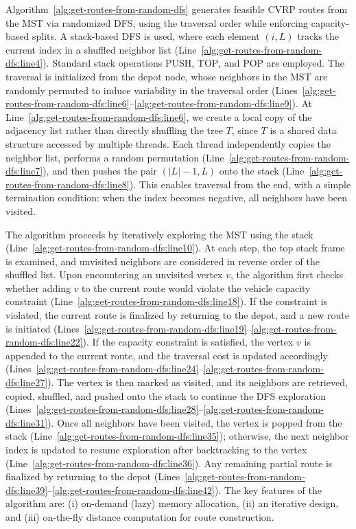Algorithm~\ref{alg:get-routes-from-random-dfs} generates feasible CVRP routes from the MST via randomized DFS, using the traversal order while enforcing capacity-based splits. A stack-based DFS is used, where each element $(i, L)$ tracks the current index in a shuffled neighbor list (Line~\ref{alg:get-routes-from-random-dfs:line4}). Standard stack operations \textsc{PUSH}, \textsc{TOP}, and \textsc{POP} are employed. The traversal is initialized from the depot node, whose neighbors in the MST are randomly permuted to induce variability in the traversal order (Lines~\ref{alg:get-routes-from-random-dfs:line6}--\ref{alg:get-routes-from-random-dfs:line9}). At Line~\ref{alg:get-routes-from-random-dfs:line6}, we create a local copy of the adjacency list rather than directly shuffling the tree $T$, since $T$ is a shared data structure accessed by multiple threads. Each thread independently copies the neighbor list, performs a random permutation (Line~\ref{alg:get-routes-from-random-dfs:line7}), and then pushes the pair $(|L|-1, L)$ onto the stack (Line~\ref{alg:get-routes-from-random-dfs:line8}). This enables traversal from the end, with a simple termination condition: when the index becomes negative, all neighbors have been visited.

The algorithm proceeds by iteratively exploring the MST using the stack (Line~\ref{alg:get-routes-from-random-dfs:line10}). At each step, the top stack frame is examined, and unvisited neighbors are considered in reverse order of the shuffled list. Upon encountering an unvisited vertex $v$, the algorithm first checks whether adding $v$ to the current route would violate the vehicle capacity constraint (Line~\ref{alg:get-routes-from-random-dfs:line18}). If the constraint is violated, the current route is finalized by returning to the depot, and a new route is initiated (Lines~\ref{alg:get-routes-from-random-dfs:line19}--\ref{alg:get-routes-from-random-dfs:line22}). If the capacity constraint is satisfied, the vertex $v$ is appended to the current route, and the traversal cost is updated accordingly (Lines~\ref{alg:get-routes-from-random-dfs:line24}--\ref{alg:get-routes-from-random-dfs:line27}). The vertex is then marked as visited, and its neighbors are retrieved, copied, shuffled, and pushed onto the stack to continue the DFS exploration (Lines~\ref{alg:get-routes-from-random-dfs:line28}--\ref{alg:get-routes-from-random-dfs:line31}). Once all neighbors have been visited, the vertex is popped from the stack (Line~\ref{alg:get-routes-from-random-dfs:line35}); otherwise, the next neighbor index is updated to resume exploration after backtracking to the vertex (Line~\ref{alg:get-routes-from-random-dfs:line36}). Any remaining partial route is finalized by returning to the depot (Lines~\ref{alg:get-routes-from-random-dfs:line39}--\ref{alg:get-routes-from-random-dfs:line42}). The key features of the algorithm are: (i) on-demand (lazy) memory allocation, (ii) an iterative design, and (iii) on-the-fly distance computation for route construction.



